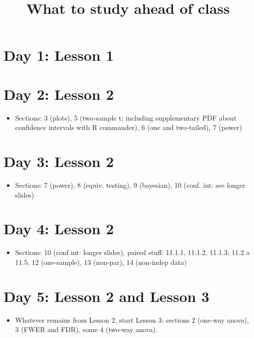 \documentclass[a4paper,11pt]{article}
\author{}
\date{}
\title{What to study ahead of class}
\begin{document}
\maketitle

\vspace*{-55pt}

\section*{Day 1: Lesson 1}
\label{sec:orgd7afc21}

\section*{Day 2: Lesson 2}
\label{sec:org147324c}
\begin{itemize}
\item Sections: 3 (plots), 5 (two-sample t; including supplementary PDF about confidence intervals with R commander), 6 (one and two-tailed), 7 (power)
\end{itemize}
\section*{Day 3: Lesson 2}
\label{sec:orgcac6b51}
\begin{itemize}
\item Sections: 7 (power), 8 (equiv. testing), 9 (bayesian), 10 (conf. int: see longer slides)
\end{itemize}
\section*{Day 4: Lesson 2}
\label{sec:orge8aa212}
\begin{itemize}
\item Sections: 10 (conf int: longer slides), paired stuff: 11.1.1, 11.1.2, 11.1.3; 11.2 a 11.5;  12 (one-sample), 13 (non-par), 14 (non-indep data)
\end{itemize}
\section*{Day 5: Lesson 2 and Lesson 3}
\label{sec:org923ec35}
\begin{itemize}
\item Whatever remains from Lesson 2, start Lesson 3: sections 2 (one-way anova), 3 (FWER and FDR), some 4 (two-way anova).
\end{itemize}
\end{document}
